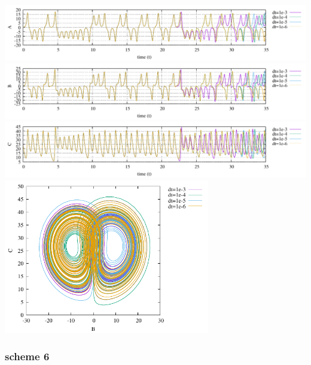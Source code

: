 \begin{center}
\includegraphics[width=16cm]{python_codes/fieldstone_156/results/scheme5/A.pdf}\\
\includegraphics[width=16cm]{python_codes/fieldstone_156/results/scheme5/B.pdf}\\
\includegraphics[width=16cm]{python_codes/fieldstone_156/results/scheme5/C.pdf}\\
\includegraphics[width=9cm]{python_codes/fieldstone_156/results/scheme5/BC.pdf}
\end{center}

\subsubsection*{scheme 6}

